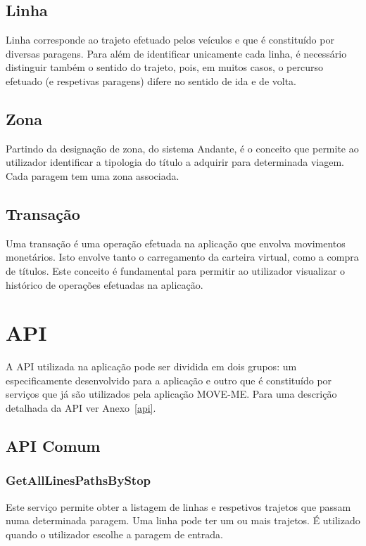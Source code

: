 \subsection{Linha}
Linha corresponde ao trajeto efetuado pelos veículos e que é constituído por diversas paragens. Para além de identificar unicamente cada linha, é necessário distinguir também o sentido do trajeto, pois, em muitos casos, o percurso efetuado (e respetivas paragens) difere no sentido de ida e de volta.

\subsection{Zona}
Partindo da designação de zona, do sistema Andante, é o conceito que permite ao utilizador identificar a tipologia do título a adquirir para determinada viagem. Cada paragem tem uma zona associada.

\subsection{Transação}
Uma transação é uma operação efetuada na aplicação que envolva movimentos monetários. Isto envolve tanto o carregamento da carteira virtual, como a compra de títulos. Este conceito é fundamental para permitir ao utilizador visualizar o histórico de operações efetuadas na aplicação.

\section{API}

A API utilizada na aplicação pode ser dividida em dois grupos: um especificamente desenvolvido para a aplicação e outro que é constituído por serviços que já são utilizados pela aplicação MOVE-ME. Para uma descrição detalhada da API ver Anexo~\ref{api}.

\subsection{API Comum}

\subsubsection{GetAllLinesPathsByStop}

Este serviço permite obter a listagem de linhas e respetivos trajetos que passam numa determinada paragem. Uma linha pode ter um ou mais trajetos. É utilizado quando o utilizador escolhe a paragem de entrada.

